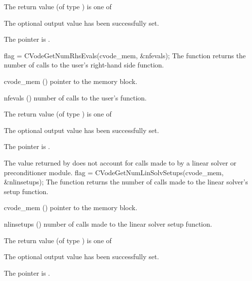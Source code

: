 {
  The return value  (of type ) is one of
  \begin{args}
  \item[\Id{CV\_SUCCESS}]
    The optional output value has been successfully set.
  \item[\Id{CV\_MEM\_NULL}]
    The  pointer is .
  \end{args}
}
{}
{
  flag = CVodeGetNumRhsEvals(cvode\_mem, \&nfevals);
}
{
  The function  returns the
  number of calls to the user's right-hand side function.
}
{
  \begin{args}
  \item[cvode\_mem] ()
    pointer to the {\cvode} memory block.
  \item[nfevals] ()
    number of calls to the user's  function.
  \end{args}
}
{
  The return value  (of type ) is one of
  \begin{args}
  \item[\Id{CV\_SUCCESS}]
    The optional output value has been successfully set.
  \item[\Id{CV\_MEM\_NULL}]
    The  pointer is .
  \end{args}
}
{
  The  value returned by  does not
  account for calls made to  by a linear solver or preconditioner
  module.
}
{
  flag = CVodeGetNumLinSolvSetups(cvode\_mem, \&nlinsetups);
}
{
  The function  returns the
  number of calls made to the linear solver's setup function.
}
{
  \begin{args}[nlinsetups]
  \item[cvode\_mem] ()
    pointer to the {\cvode} memory block.
  \item[nlinsetups] ()
    number of calls made to the linear solver setup function.
  \end{args}
}
{
  The return value  (of type ) is one of
  \begin{args}
  \item[\Id{CV\_SUCCESS}]
    The optional output value has been successfully set.
  \item[\Id{CV\_MEM\_NULL}]
    The  pointer is .
  \end{args}
}
